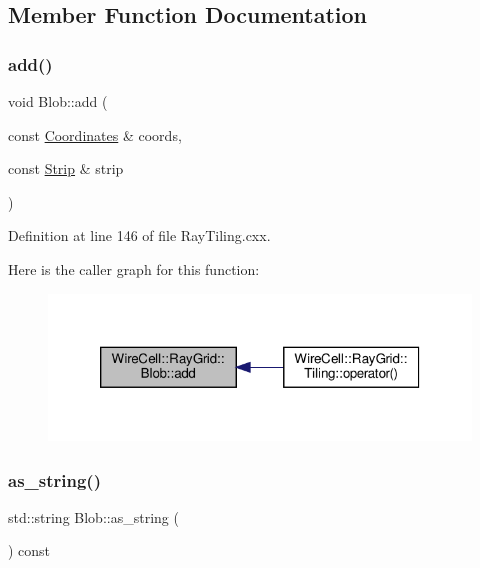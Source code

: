 \subsection{Member Function Documentation}
\mbox{\label{class_wire_cell_1_1_ray_grid_1_1_blob_a5346f52ed7b1ffd40324bdf32095c392}} 
\subsubsection{\texorpdfstring{add()}{add()}}
{\footnotesize\ttfamily void Blob\+::add (\begin{DoxyParamCaption}\item[{const \hyperlink{class_wire_cell_1_1_ray_grid_1_1_coordinates}{Coordinates} \&}]{coords,  }\item[{const \hyperlink{struct_wire_cell_1_1_ray_grid_1_1_strip}{Strip} \&}]{strip }\end{DoxyParamCaption})}



Definition at line 146 of file Ray\+Tiling.\+cxx.

Here is the caller graph for this function\+:
\nopagebreak
\begin{figure}[H]
\begin{center}
\leavevmode
\includegraphics[width=320pt]{class_wire_cell_1_1_ray_grid_1_1_blob_a5346f52ed7b1ffd40324bdf32095c392_icgraph}
\end{center}
\end{figure}
\mbox{\label{class_wire_cell_1_1_ray_grid_1_1_blob_a5cd495991564b493c9b8dcb267c090d8}} 
\subsubsection{\texorpdfstring{as\+\_\+string()}{as\_string()}}
{\footnotesize\ttfamily std\+::string Blob\+::as\+\_\+string (\begin{DoxyParamCaption}{ }\end{DoxyParamCaption}) const}



